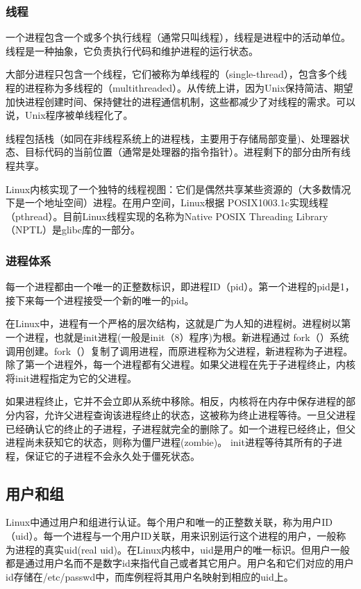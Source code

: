 \subsubsection{线程}

一个进程包含一个或多个执行线程（通常只叫线程），线程是进程中的活动单位。线程是一种抽象，它负责执行代码和维护进程的运行状态。

大部分进程只包含一个线程，它们被称为单线程的（single-thread），包含多个线程的进程称为多线程的（multithreaded）。从传统上讲，因为Unix保持简洁、期望加快进程创建时间、保持健壮的进程通信机制，这些都减少了对线程的需求。可以说，Unix程序被单线程化了。

线程包括栈（如同在非线程系统上的进程栈，主要用于存储局部变量)、处理器状态、目标代码的当前位置（通常是处理器的指令指针）。进程剩下的部分由所有线程共享。

Linux内核实现了一个独特的线程视图：它们是偶然共享某些资源的（大多数情况下是一个地址空间）进程。在用户空间，Linux根据 POSIX1003.1c实现线程（pthread）。目前Linux线程实现的名称为Native POSIX Threading Library（NPTL）是glibc库的一部分。

\subsubsection{进程体系}

每一个进程都由一个唯一的正整数标识，即进程ID（pid）。第一个进程的pid是1，接下来每一个进程接受一个新的唯一的pid。

在Linux中，进程有一个严格的层次结构，这就是广为人知的进程树。进程树以第一个进程，也就是init进程(一般是init（8）程序)为根。新进程通过 fork（）系统调用创建。fork（）复制了调用进程，而原进程称为父进程，新进程称为子进程。除了第一个进程外，每一个进程都有父进程。如果父进程在先于子进程终止，内核将init进程指定为它的父进程。

如果进程终止，它并不会立即从系统中移除。相反，内核将在内存中保存进程的部分内容，允许父进程查询该进程终止的状态，这被称为终止进程等待。一旦父进程已经确认它的终止的子进程，子进程就完全的删除了。如一个进程已经终止，但父进程尚未获知它的状态，则称为僵尸进程(zombie)。 init进程等待其所有的子进程，保证它的子进程不会永久处于僵死状态。

\subsection{用户和组}

Linux中通过用户和组进行认证。每个用户和唯一的正整数关联，称为用户ID（uid）。每一个进程与一个用户ID关联，用来识别运行这个进程的用户，一般称为进程的真实uid(real uid)。在Linux内核中，uid是用户的唯一标识。但用户一般都是通过用户名而不是数字id来指代自己或者其它用户。用户名和它们对应的用户id存储在/etc/passwd中，而库例程将其用户名映射到相应的uid上。

